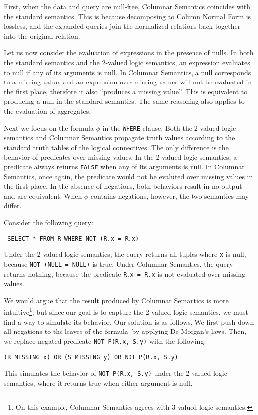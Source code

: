 \documentclass[sigconf,nonacm]{acmart}
\begin{document}
First, when the data and query are null-free,
 Columnar Semantics coincides with the standard semantics.
This is because decomposing to Column Normal Form 
 is lossless, and the expanded queries 
 join the normalized relations back together 
 into the original relation.

Let us now consider the evaluation of expressions in the presence of nulls.
In both the standard semantics and the 2-valued logic semantics,
 an expression evaluates to null if any of its arguments is null.
In Columnar Semantics, 
 a null corresponds to a missing value, 
 and an expression over missing values 
 will not be evaluated in the first place,
 therefore it also ``produces a missing value''.
This is equivalent to producing a null in the standard semantics.
The same reasoning also applies to the evaluation of aggregates.

Next we focus on the formula $\phi$ in the \lstinline|WHERE| clause.
Both the 2-valued logic semantics and Columnar Semantics
 propagate truth values according to the standard 
 truth tables of the logical connectives.
The only difference is the behavior of predicates over missing values.
In the 2-valued logic semantics, 
 a predicate always returns \lstinline|FALSE| when any of its arguments is null.
In Columnar Semantics, once again, 
 the predicate would not be evaluted over missing values in the first place.
In the absence of negations,
 both behaviors result in no output and are equivalent.
When $\phi$ contains negations, however, 
 the two semantics may differ.
%
\begin{example}
Consider the following query:
\begin{lstlisting}
 SELECT * FROM R WHERE NOT (R.x = R.x)
\end{lstlisting}
Under the 2-valued logic semantics, 
 the query returns all tuples where \lstinline|x| is null, 
 because \lstinline|NOT (NULL = NULL)| is true.
Under Columnar Semantics, 
 the query returns nothing, 
 because the predicate \lstinline|R.x = R.x| is not evaluated 
 over missing values.
\end{example}
%
We would argue that the result produced 
 by Columnar Semantics is more intuitive\footnote{On this example, 
 Columnar Semantics agrees with 3-valued logic semantics.};
 but since our goal is to capture the 2-valued logic semantics,
 we must find a way to simulate its behavior.
Our solution is as follows.
We first push down all negations to the leaves of the formula, 
 by applying De Morgan's laws.
Then, we replace negated predicate \lstinline|NOT P(R.x, S.y)|
 with the following:
%
\begin{lstlisting}
(R MISSING x) OR (S MISSING y) OR NOT P(R.x, S.y)
\end{lstlisting}
% 
This simulates the behavior of \lstinline|NOT P(R.x, S.y)|
 under the 2-valued logic semantics, 
 where it returns true when either argument is null.
\end{document}
